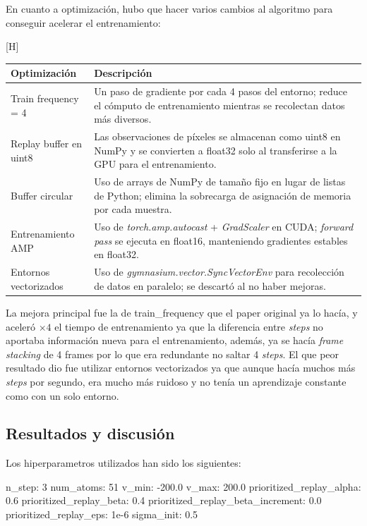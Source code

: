 \documentclass[onecolumn]{cwpreport} %
\makeatletter
\renewenvironment{table}[1][htbp]{%
  \let\@makecaption=\GJ@maketablecaption
  \@float{table}[#1]\fstyle@table
}{%
  \end@float
}
\makeatother
\begin{document}
En cuanto a optimización, hubo que hacer varios cambios al algoritmo para conseguir acelerar el entrenamiento:

\begin{table}[H]
\centering
\small
\renewcommand{\arraystretch}{1.5}
\begin{tabular}{l p{10cm}}
\hline
\textbf{Optimización} & \textbf{Descripción} \\
\hline
Train frequency = 4 & Un paso de gradiente por cada 4 pasos del entorno; reduce el cómputo de entrenamiento mientras se recolectan datos más diversos. \\
Replay buffer en uint8 & Las observaciones de píxeles se almacenan como uint8 en NumPy y se convierten a float32 solo al transferirse a la GPU para el entrenamiento. \\
Buffer circular & Uso de arrays de NumPy de tamaño fijo en lugar de listas de Python; elimina la sobrecarga de asignación de memoria por cada muestra. \\
Entrenamiento AMP & Uso de \textit{torch.amp.autocast} + \textit{GradScaler} en CUDA; \textit{forward pass} se ejecuta en float16, manteniendo gradientes estables en float32. \\
Entornos vectorizados & Uso de \textit{gymnasium.vector.SyncVectorEnv} para recolección de datos en paralelo; se descartó al no haber mejoras. \\
\hline
\end{tabular}
\end{table}

La mejora principal fue la de train\_frequency que el paper original ya lo hacía, y aceleró $\times 4$ el tiempo de entrenamiento ya que la diferencia entre \textit{steps} no aportaba información nueva para el entrenamiento, además, ya se hacía \textit{frame stacking} de 4 frames por lo que era redundante no saltar 4 \textit{steps}. El que peor resultado dio fue utilizar entornos vectorizados ya que aunque hacía muchos más \textit{steps} por segundo, era mucho más ruidoso y no tenía un aprendizaje constante como con un solo entorno.

\subsection{Resultados y discusión}
Los hiperparametros utilizados han sido los siguientes:

\begin{mycode}
n_step: 3
num_atoms: 51
v_min: -200.0
v_max: 200.0
prioritized_replay_alpha: 0.6
prioritized_replay_beta: 0.4
prioritized_replay_beta_increment: 0.0
prioritized_replay_eps: 1e-6
sigma_init: 0.5
\end{mycode}
\end{document}

